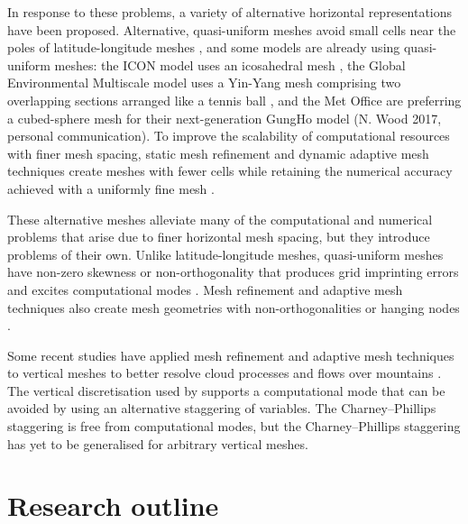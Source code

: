 In response to these problems, a variety of alternative horizontal representations have been proposed.
Alternative, quasi-uniform meshes avoid small cells near the poles of latitude-longitude meshes \citep{staniforth-thuburn2012}, and some models are already using quasi-uniform meshes: the ICON model uses an icosahedral mesh \citep{zaengl2015}, the Global Environmental Multiscale model uses a Yin-Yang mesh comprising two overlapping sections arranged like a tennis ball \citep{qaddouri-lee2011}, and the Met Office are preferring a cubed-sphere mesh for their next-generation GungHo model (N. Wood 2017, personal communication).
To improve the scalability of computational resources with finer mesh spacing, static mesh refinement and dynamic adaptive mesh techniques create meshes with fewer cells while retaining the numerical accuracy achieved with a uniformly fine mesh \citep{jablonowski2009}.

These alternative meshes alleviate many of the computational and numerical problems that arise due to finer horizontal mesh spacing, but they introduce problems of their own. 
Unlike latitude-longitude meshes, quasi-uniform meshes have non-zero skewness or non-orthogonality that produces grid imprinting errors and excites computational modes \citep{weller2012}.
Mesh refinement and adaptive mesh techniques also create mesh geometries with non-orthogonalities or hanging nodes \citep{marras2016}.

Some recent studies have applied mesh refinement and adaptive mesh techniques to vertical meshes to better resolve cloud processes \citep{mueller2013} and flows over mountains \citep{yamazaki-satomura2012}.  
The vertical discretisation used by \citet{yamazaki-satomura2012} supports a computational mode \citep{thuburn-woolings2005} that can be avoided by using an alternative staggering of variables.
The Charney--Phillips staggering is free from computational modes, but the Charney--Phillips staggering has yet to be generalised for arbitrary vertical meshes.

\section{Research outline}

